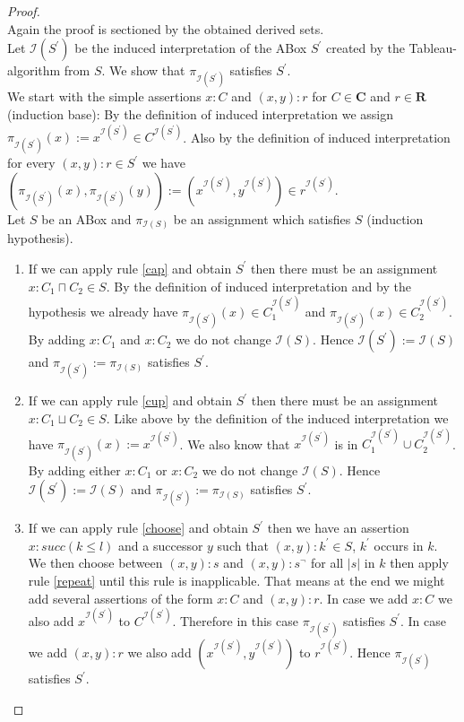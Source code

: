 \documentclass[a4paper,11pt]{scrartcl}
\theoremstyle{break}
\theoremstyle{definition}
\begin{document}
\begin{proof}$ $\\
Again the proof is sectioned by the obtained derived sets.\\
Let $\mathcal{I}(S^\prime)$ be the induced interpretation of the ABox $S^\prime$ created by the Tableau-algorithm from $S$. We show that $\pi_{\mathcal{I}(S^\prime)}$ satisfies $S^\prime$.\\
We start with the simple assertions $x:C$ and $(x,y):r$ for $C\in\mathbf{C}$ and $r\in\mathbf{R}$ (induction base): By the definition of induced interpretation we assign $\pi_{\mathcal{I}(S^\prime)}(x):=x^{\mathcal{I}(S^\prime)}\in C^{\mathcal{I}(S^\prime)}$. Also by the definition of induced interpretation for every $(x,y):r\in S^\prime$ we have $(\pi_{\mathcal{I}(S^\prime)}(x),\pi_{\mathcal{I}(S^\prime)}(y)):=(x^{\mathcal{I}(S^\prime)},y^{\mathcal{I}(S^\prime)})\in r^{\mathcal{I}(S^\prime)}$.\\
Let $S$ be an ABox and $\pi_{\mathcal{I}(S)}$ be an assignment which satisfies $S$ (induction hypothesis).\par
\begin{enumerate}
\item If we can apply rule \ref{cap} and obtain $S^\prime$ then there must be an assignment $x:C_1\sqcap C_2\in S$. By the definition of induced interpretation and by the hypothesis we already have $\pi_{\mathcal{I}(S^\prime)}(x)\in C_1^{\mathcal{I}(S^\prime)}$ and $\pi_{\mathcal{I}(S^\prime)}(x)\in C_2^{\mathcal{I}(S^\prime)}$. By adding $x:C_1$ and $x:C_2$ we do not change $\mathcal{I}(S)$. Hence $\mathcal{I}(S^\prime):=\mathcal{I}(S)$ and $\pi_{\mathcal{I}(S^\prime)}:=\pi_{\mathcal{I}(S)}$ satisfies $S^\prime$.
\item If we can apply rule \ref{cup} and obtain $S^\prime$ then there must be an assignment $x:C_1\sqcup C_2\in S$. Like above by the definition of the induced interpretation we have $\pi_{\mathcal{I}(S^\prime)}(x):=x^{\mathcal{I}(S^\prime)}$. We also know that $x^{\mathcal{I}(S^\prime)}$ is in $C_1^{\mathcal{I}(S^\prime)}\cup C_2^{\mathcal{I}(S^\prime)}$. By adding either $x:C_1$ or $x:C_2$ we do not change $\mathcal{I}(S)$. Hence $\mathcal{I}(S^\prime):=\mathcal{I}(S)$ and $\pi_{\mathcal{I}(S^\prime)}:=\pi_{\mathcal{I}(S)}$ satisfies $S^\prime$.
\item If we can apply rule \ref{choose} and obtain $S^\prime$ then we have an assertion $x:succ(k\leq l)$ and a successor $y$ such that $(x,y):k^\prime\in S$, $k^\prime$ occurs in $k$. We then choose between $(x,y):s$ and $(x,y):s^\neg$ for all $|s|$ in $k$ then apply rule \ref{repeat} until this rule is inapplicable. That means at the end we might add several assertions of the form $x:C$ and $(x,y):r$. In case we add $x:C$ we also add $x^{\mathcal{I}(S^\prime)}$ to $C^{\mathcal{I}(S^\prime)}$. Therefore in this case $\pi_{\mathcal{I}(S^\prime)}$ satisfies $S^\prime$. In case we add $(x,y):r$ we also add $(x^{\mathcal{I}(S^\prime)},y^{\mathcal{I}(S^\prime)})$ to $r^{\mathcal{I}(S^\prime)}$. Hence $\pi_{\mathcal{I}(S^\prime)}$ satisfies $S^\prime$.

\end{enumerate}
\end{proof}
\end{document}
